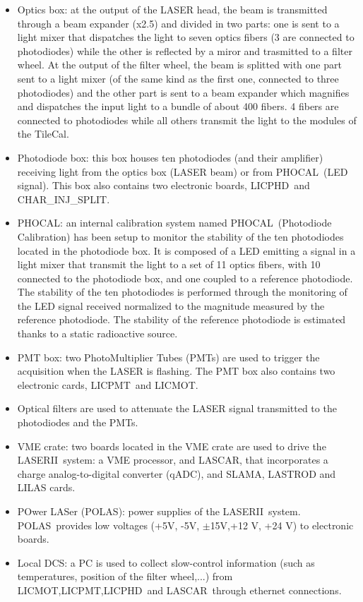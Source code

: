 \documentclass[UKenglish,texlive=2013]{\ATLASLATEXPATH atlasdoc}
\newcommand{\lasii}{{\sc LASERII}}
\newcommand{\phocal}{{\sc PHOCAL}}
\newcommand{\licphd}{{\sc LICPHD}}
\newcommand{\licpmt}{{\sc LICPMT}}
\newcommand{\licmot}{{\sc LICMOT}}
\newcommand{\lascar}{{\sc LASCAR}}
\newcommand{\polas}{{\sc POLAS}}
\newcommand{\charinjsplit}{{\sc CHAR\_INJ\_SPLIT}}
\begin{document}
\begin{itemize}
\item Optics box: at the output of the LASER head, the beam is transmitted through a beam expander (x2.5) and divided in two parts: one is sent to a light mixer that dispatches the light to seven optics fibers (3 are connected to photodiodes) while the other is reflected by a miror and trasmitted to a filter wheel. At the output of the filter wheel, the beam is splitted with one part sent to a light mixer (of the same kind as the first one, connected to three photodiodes) and the other part is sent to a beam expander which magnifies and dispatches the input light to a bundle of about 400 fibers. 4 fibers are connected to photodiodes while all others transmit the light to the modules of the TileCal.

\item Photodiode box: this box houses ten photodiodes (and their amplifier) receiving light from the optics box (LASER beam) or from \phocal~(LED signal). This box also contains two electronic boards, \licphd~and \charinjsplit.


\item \phocal: an internal calibration system named \phocal~(Photodiode Calibration) has been setup to monitor the stability of the ten photodiodes located in the photodiode box. It is composed of a LED emitting a signal in a light mixer that transmit the light to a set of 11 optics fibers, with 10 connected to the photodiode box, and one coupled to a reference photodiode. 
The stability of the ten photodiodes is performed through the monitoring of the LED signal received normalized to the magnitude measured by the reference photodiode. The stability of the reference photodiode is estimated thanks to a static radioactive source. 

\item PMT box: two PhotoMultiplier Tubes (PMTs) are used to trigger the acquisition when the LASER is flashing. The PMT box also contains two electronic cards, \licpmt~and \licmot.

\item Optical filters are used to attenuate the LASER signal transmitted to the photodiodes and the PMTs.

\item VME crate: two boards located in the VME crate are used to drive the \lasii~system: a VME processor, and \lascar, that incorporates a charge analog-to-digital converter (qADC), and SLAMA, LASTROD and LILAS cards.

\item POwer LASer (\polas): power supplies of the \lasii~system. \polas~provides low voltages (+5V, -5V, $\pm$15V,+12 V, +24 V) to electronic boards.

\item Local DCS: a PC is used to collect slow-control information (such as temperatures, position of the filter wheel,...) from \licmot,\licpmt,\licphd~and \lascar~through ethernet connections.



\end{itemize}
\end{document}
